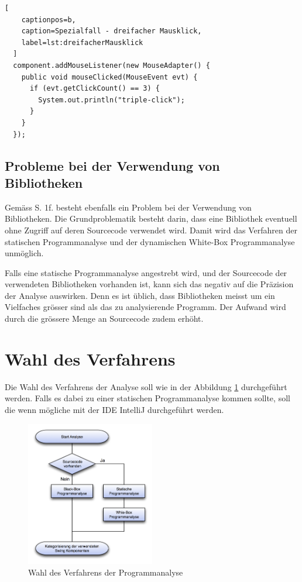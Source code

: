   \begin{lstlisting}[
    captionpos=b,
    caption=Spezialfall - dreifacher Mausklick,
    label=lst:dreifacherMausklick
  ]
  component.addMouseListener(new MouseAdapter() {
    public void mouseClicked(MouseEvent evt) {
      if (evt.getClickCount() == 3) {
        System.out.println("triple-click");
      }
    }
  });
  \end{lstlisting}
  
  \subsection{Probleme bei der Verwendung von Bibliotheken}
  
  Gemäss \cite{GUIAnalysenUndBibliotheken} S. 1f. besteht ebenfalls ein Problem
  bei der Verwendung von Bibliotheken. Die Grundproblematik besteht darin,
  dass eine Bibliothek eventuell ohne Zugriff auf deren Sourcecode verwendet
  wird. Damit wird das Verfahren der statischen Programmanalyse und der
  dynamischen White-Box Programmanalyse unmöglich.
  
  Falls eine statische Programmanalyse angestrebt wird, und der Sourcecode der
  verwendeten Bibliotheken vorhanden ist, kann sich das negativ auf die
  Präzision der Analyse auswirken. Denn es ist üblich, dass Bibliotheken
  meisst um ein Vielfaches grösser sind als das zu analysierende Programm. Der
  Aufwand wird durch die grössere Menge an Sourcecode zudem erhöht.
  
  \section{Wahl des Verfahrens}
  
  Die Wahl des Verfahrens der Analyse soll wie in der Abbildung
  \ref{img:guiAnalyse} durchgeführt werden. Falls es dabei zu einer statischen
  Programmanalyse kommen sollte, soll die wenn mögliche mit der \ac{IDE}
  IntelliJ durchgeführt werden.
  
  \begin{figure}[ht]
    \begin{center}
      \includegraphics[width=0.5\textwidth]{./image/guiAnalyse.png}
      \caption{Wahl des Verfahrens der Programmanalyse}
      \label{img:guiAnalyse}
    \end{center}
  \end{figure}
  
